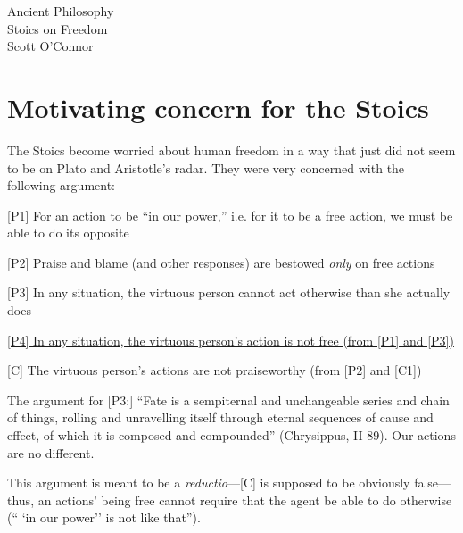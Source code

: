 \documentclass[11pt]{article}
\begin{document}
\thispagestyle{empty}
\begin{center} \LARGE{Ancient Philosophy\\ Stoics on Freedom}\\ \vspace*{2mm}
\large{Scott O'Connor}\end{center}
\thispagestyle{empty}\vspace*{3mm}

\section*{Motivating concern for the Stoics}

\noindent The Stoics become worried about human freedom in a way that just did not seem to be on Plato and Aristotle's radar. They were very concerned with the following argument:
\vspace*{2mm}

[P1] For an action to be ``in our power,'' i.e. for it to be a free action, we must be able to do its opposite\vspace*{1mm}

[P2] Praise and blame (and other responses) are bestowed \emph{only} on free actions
\vspace*{1mm}

[P3] In any situation, the virtuous person cannot act otherwise than she actually does
\vspace*{1mm}

\underline{[P4] In any situation, the virtuous person's action is not free (from [P1] and [P3])}
\vspace*{1mm}

[C] The virtuous person's actions are not praiseworthy (from [P2] and [C1])
\vspace*{2mm}


\vspace*{2mm}

\noindent The argument for [P3:] ``Fate is a sempiternal and unchangeable series and chain of things, rolling and unravelling itself through eternal sequences of cause and effect, of which it is composed and compounded'' (Chrysippus, II-89). Our actions are no different.
\vspace*{2mm}

\noindent This argument is meant to be a \emph{reductio}---[C] is supposed to be obviously false---thus, an actions' being free cannot require that the agent be able to do otherwise (`` `in our power'' is not like that'').
\end{document}
